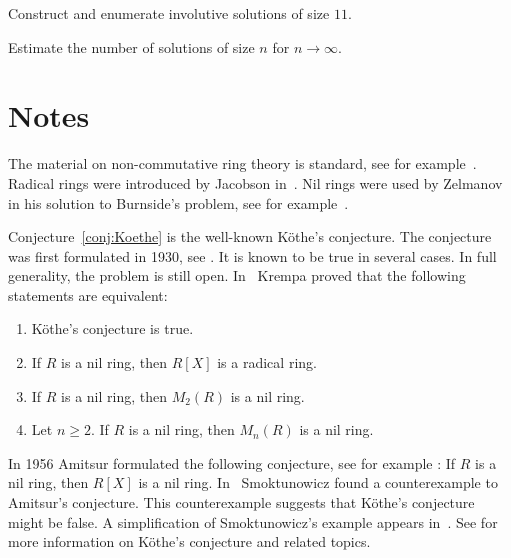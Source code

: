 


\begin{problem}
Construct and enumerate involutive solutions of size $11$. 
\end{problem}

\begin{problem}
Estimate the number of solutions of size $n$ for $n\to\infty$. 
\end{problem}

\section*{Notes}

The material on non-commutative ring theory is standard, see for example~\cite{MR3308118}.
Radical rings were introduced by Jacobson in~\cite{MR12271}. Nil rings were
used by Zelmanov in his solution to Burnside's problem, see for example~\cite{MR1199575}. 


Conjecture~\ref{conj:Koethe} is the well-known K\"othe's conjecture. 
The conjecture was first formulated in 1930, see \cite{MR1545158}. It is known to be true
in several cases. In full generality, the problem is still open. In~\cite{MR306251} 
Krempa proved that
the following statements are equivalent:
\begin{enumerate}
    \item K\"othe's conjecture is true.  
    \item If $R$ is a nil ring, then $R[X]$ is a radical ring. 
    \item If $R$ is a nil ring, then $M_2(R)$ is a nil ring. 
    \item Let $n\geq2$. If $R$ is a nil ring, then $M_n(R)$ is a nil ring. 
\end{enumerate}

In 1956 Amitsur formulated the following conjecture, see for example
\cite{MR0347873}: If $R$ is a nil ring, then $R[X]$ is a nil ring. In~\cite{MR1793911} 
Smoktunowicz found a counterexample to Amitsur's conjecture. 
This counterexample suggests that K\"othe's conjecture might be false. 
A simplification of Smoktunowicz's example
appears in~\cite{MR3169522}. See \cite{MR1879880,MR2275597} for more
information on K\"othe's conjecture and related topics. 


